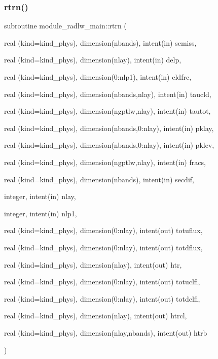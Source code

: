 \subsubsection{\texorpdfstring{rtrn()}{rtrn()}}
{\footnotesize\ttfamily subroutine module\+\_\+radlw\+\_\+main\+::rtrn (\begin{DoxyParamCaption}\item[{real (kind=kind\+\_\+phys), dimension(nbands), intent(in)}]{semiss,  }\item[{real (kind=kind\+\_\+phys), dimension(nlay), intent(in)}]{delp,  }\item[{real (kind=kind\+\_\+phys), dimension(0\+:nlp1), intent(in)}]{cldfrc,  }\item[{real (kind=kind\+\_\+phys), dimension(nbands,nlay), intent(in)}]{taucld,  }\item[{real (kind=kind\+\_\+phys), dimension(ngptlw,nlay), intent(in)}]{tautot,  }\item[{real (kind=kind\+\_\+phys), dimension(nbands,0\+:nlay), intent(in)}]{pklay,  }\item[{real (kind=kind\+\_\+phys), dimension(nbands,0\+:nlay), intent(in)}]{pklev,  }\item[{real (kind=kind\+\_\+phys), dimension(ngptlw,nlay), intent(in)}]{fracs,  }\item[{real (kind=kind\+\_\+phys), dimension(nbands), intent(in)}]{secdif,  }\item[{integer, intent(in)}]{nlay,  }\item[{integer, intent(in)}]{nlp1,  }\item[{real (kind=kind\+\_\+phys), dimension(0\+:nlay), intent(out)}]{totuflux,  }\item[{real (kind=kind\+\_\+phys), dimension(0\+:nlay), intent(out)}]{totdflux,  }\item[{real (kind=kind\+\_\+phys), dimension(nlay), intent(out)}]{htr,  }\item[{real (kind=kind\+\_\+phys), dimension(0\+:nlay), intent(out)}]{totuclfl,  }\item[{real (kind=kind\+\_\+phys), dimension(0\+:nlay), intent(out)}]{totdclfl,  }\item[{real (kind=kind\+\_\+phys), dimension(nlay), intent(out)}]{htrcl,  }\item[{real (kind=kind\+\_\+phys), dimension(nlay,nbands), intent(out)}]{htrb }\end{DoxyParamCaption})\hspace{0.3cm}{\ttfamily [private]}}

